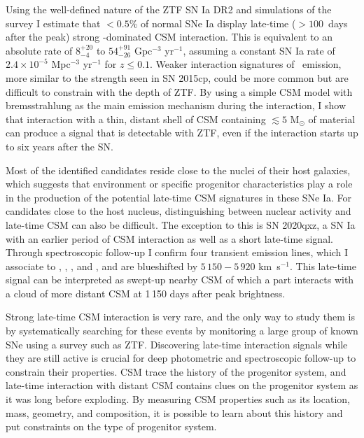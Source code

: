 \begin{abstracts}
Using the well-defined nature of the ZTF SN Ia DR2 and simulations of the survey I estimate that $<0.5$\% of normal SNe Ia display late-time ($> 100$~days after the peak) strong \Halpha-dominated CSM interaction. This is equivalent to an absolute rate of $8^{+20}_{-4}$ to $54^{+91}_{-26}$ Gpc$^{-3}$ yr$^{-1}$, assuming a constant SN Ia rate of $2.4 \times 10^{-5}$ Mpc$^{-3}$ yr$^{-1}$ for $z \leq 0.1$. Weaker interaction signatures of \Halpha\ emission, more similar to the strength seen in SN 2015cp, could be more common but are difficult to constrain with the depth of ZTF. By using a simple CSM model with bremsstrahlung as the main emission mechanism during the interaction, I show that interaction with a thin, distant shell of CSM containing $\lesssim5$ M$_\odot$ of material can produce a signal that is detectable with ZTF, even if the interaction starts up to six years after the SN.

Most of the identified candidates reside close to the nuclei of their host galaxies, which suggests that environment or specific progenitor characteristics play a role in the production of the potential late-time CSM signatures in these SNe Ia. For candidates close to the host nucleus, distinguishing between nuclear activity and late-time CSM can also be difficult. The exception to this is SN 2020qxz, a SN Ia with an earlier period of CSM interaction as well as a short late-time signal. Through spectroscopic follow-up I confirm four transient emission lines, which I associate to \Hbeta, \CaII, \NI, and \KI, and are blueshifted by $5\,150 - 5\,920$ km~s$^{-1}$. This late-time signal can be interpreted as swept-up nearby CSM of which a part interacts with a cloud of more distant CSM at 1\,150 days after peak brightness.

Strong late-time CSM interaction is very rare, and the only way to study them is by systematically searching for these events by monitoring a large group of known SNe using a survey such as ZTF. Discovering late-time interaction signals while they are still active is crucial for deep photometric and spectroscopic follow-up to constrain their properties. CSM trace the history of the progenitor system, and late-time interaction with distant CSM contains clues on the progenitor system as it was long before exploding. By measuring CSM properties such as its location, mass, geometry, and composition, it is possible to learn about this history and put constraints on the type of progenitor system.

\end{abstracts}


\restoregeometry


